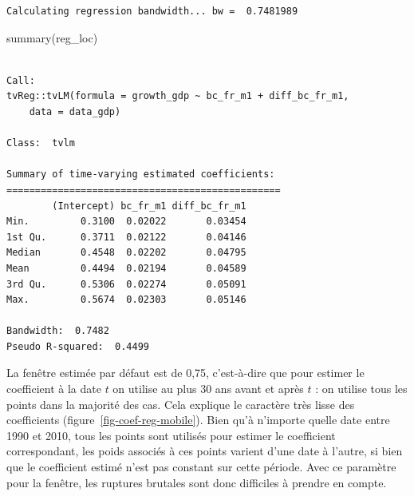 \documentclass[
  a4paper,
  DIV=11,
  numbers=noendperiod,
  french]{scrartcl}
\newenvironment{Shaded}{\begin{snugshade}}{\end{snugshade}}
\newcommand{\FunctionTok}[1]{\textcolor[rgb]{0.28,0.35,0.67}{#1}}
\newcommand{\NormalTok}[1]{\textcolor[rgb]{0.00,0.23,0.31}{#1}}
\newcommand\1{{\mathds 1}}
\theoremstyle{remark}
\begin{document}
\begin{verbatim}
Calculating regression bandwidth... bw =  0.7481989 
\end{verbatim}

\begin{Shaded}
\begin{Highlighting}[]
\FunctionTok{summary}\NormalTok{(reg\_loc)}
\end{Highlighting}
\end{Shaded}

\begin{verbatim}

Call: 
tvReg::tvLM(formula = growth_gdp ~ bc_fr_m1 + diff_bc_fr_m1, 
    data = data_gdp)

Class:  tvlm 

Summary of time-varying estimated coefficients: 
================================================ 
        (Intercept) bc_fr_m1 diff_bc_fr_m1
Min.         0.3100  0.02022       0.03454
1st Qu.      0.3711  0.02122       0.04146
Median       0.4548  0.02202       0.04795
Mean         0.4494  0.02194       0.04589
3rd Qu.      0.5306  0.02274       0.05091
Max.         0.5674  0.02303       0.05146

Bandwidth:  0.7482
Pseudo R-squared:  0.4499 
\end{verbatim}

La fenêtre estimée par défaut est de 0,75, c'est-à-dire que pour estimer
le coefficient à la date \(t\) on utilise au plus 30 ans avant et après
\(t\) : on utilise tous les points dans la majorité des cas. Cela
explique le caractère très lisse des coefficients
(figure~\ref{fig-coef-reg-mobile}). Bien qu'à n'importe quelle date
entre 1990 et 2010, tous les points sont utilisés pour estimer le
coefficient correspondant, les poids associés à ces points varient d'une
date à l'autre, si bien que le coefficient estimé n'est pas constant sur
cette période. Avec ce paramètre pour la fenêtre, les ruptures brutales
sont donc difficiles à prendre en compte.
\end{document}
